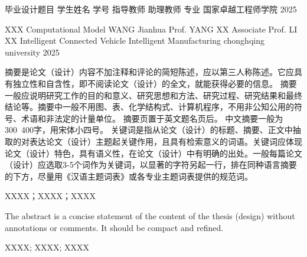 \documentclass{document}
\begin{document}
\makecovercn
  {毕业设计题目}
  {学生姓名}
  {学号}
  {指导教师}
  {助理教师}
  {专业}
  {国家卓越工程师学院}
  {2025}

\makecoveren
  {XXX Computational Model}
  {WANG Jianhua}
  {Prof. YANG XX}
  {Associate Prof. LI XX} 
  {Intelligent Connected Vehicle}
  {Intelligent Manufacturing}
  {chonghqing university}
  {2025} 

\begin{cquabstract}
    摘要是论文（设计）内容不加注释和评论的简短陈述，应以第三人称陈述。它应具有独立性和自含性，即不阅读论文（设计）的全文，就能获得必要的信息。
摘要一般应说明研究工作的目的和意义、研究思想和方法、研究过程、研究结果和最终结论等。摘要中一般不用图、表、化学结构式、计算机程序，不用非公知公用的符号、术语和非法定的计量单位。
摘要页置于英文题名页后。 
中文摘要一般为300~400字，用宋体小四号。 
关键词是指从论文（设计）的标题、摘要、正文中抽取的对表达论文（设计）主题起关键作用，且具有检索意义的词语。关键词应体现论文（设计）特色，具有语义性，在论文（设计）中有明确的出处。一般每篇论文（设计）应选取3-5个词作为关键词，以显著的字符另起一行，排在同种语言摘要的下方，尽量用《汉语主题词表》或各专业主题词表提供的规范词。
\end{cquabstract}
  
\begin{cqukeywords}
    XXXX；XXXX；XXXX
\end{cqukeywords}

\begin{cquabstracten}
  The abstract is a concise statement of the content of the thesis (design) without annotations or comments. It should be compact and refined.
\end{cquabstracten}

\begin{cqukeywordsen}
  XXXX; XXXX; XXXX
\end{cqukeywordsen}
  
\begin{cqucontents}
\end{cqucontents}


\end{document}
